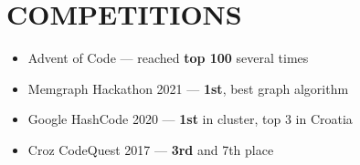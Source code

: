 \documentclass{article}
\begin{document}


\section{COMPETITIONS}
\begin{itemize}
  \itemsep0em
  \item Advent of Code --- reached {\bfseries top 100} several times
  \item Memgraph Hackathon 2021 --- {\bfseries 1st}, best graph algorithm
  \item Google HashCode 2020 --- {\bfseries 1st} in cluster, top 3 in Croatia
  \item Croz CodeQuest 2017 --- {\bfseries 3rd} and 7th place
\end{itemize}

\end{document}
